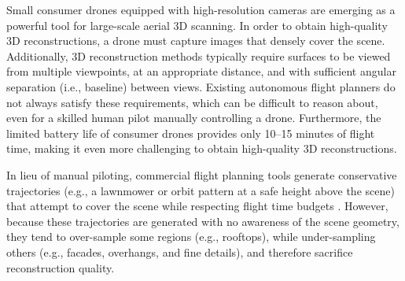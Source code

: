 
\label{sec:ch4}

Small consumer drones equipped with high-resolution cameras are emerging as a powerful tool for large-scale aerial 3D scanning.
In order to obtain high-quality 3D reconstructions, a drone must capture images that densely cover the scene.
Additionally, 3D reconstruction methods typically require surfaces to be viewed from multiple viewpoints, at an appropriate distance, and with sufficient angular separation (i.e., baseline) between views.
Existing autonomous flight planners do not always satisfy these  requirements, which can be difficult to reason about, even for a skilled human pilot manually controlling a drone.
Furthermore, the limited battery life of consumer drones provides only 10--15 minutes of flight time, making it even more challenging to obtain high-quality 3D reconstructions.


In lieu of manual piloting, commercial flight planning tools generate conservative trajectories (e.g., a lawnmower or orbit pattern at a safe height above the scene) that attempt to cover the scene while respecting flight time budgets \cite{3dr:2017a,pix4d:2017a}.
However, because these trajectories are generated with no awareness of the scene geometry, they tend to over-sample some regions (e.g., rooftops), while under-sampling others (e.g., facades, overhangs, and fine details), and therefore sacrifice reconstruction quality.

